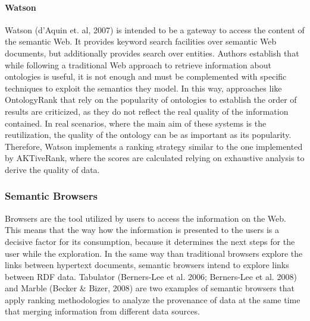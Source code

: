 \paragraph{Watson}
Watson (d’Aquin et. al, 2007) is intended to be a gateway to access the content of the semantic Web. It provides keyword search facilities over semantic Web documents, but additionally provides search over entities. Authors establish that while following a traditional Web approach to retrieve information about ontologies is useful, it is not enough and must be complemented with specific techniques to exploit the semantics they model. In this way, approaches like OntologyRank that rely on the popularity of ontologies to establish the order of results are criticized, as they do not reflect the real quality of the information contained. In real scenarios, where the main aim of these systems is the reutilization, the quality of the ontology can be as important as its popularity. Therefore, Watson implements a ranking strategy similar to the one implemented by AKTiveRank, where the scores are calculated relying on exhaustive analysis to derive the quality of data.

\subsubsection{Semantic Browsers}
Browsers are the tool utilized by users to access the information on the Web. This means that the way how the information is presented to the users is a decisive factor for its consumption, because it determines the next steps for the user while the exploration. In the same way than traditional browsers explore the links between hypertext documents, semantic browsers intend to explore links between RDF data. Tabulator (Berners-Lee et al. 2006; Berners-Lee et al. 2008) and Marble (Becker \& Bizer, 2008) are two examples of semantic browsers that apply ranking methodologies to analyze the provenance of data at the same time that merging information from different data sources.

